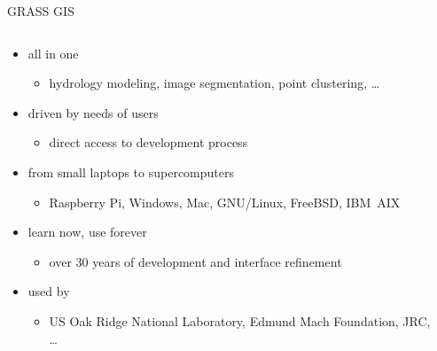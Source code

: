 \documentclass[xcolor={dvipsnames,usenames},beamer,aspectratio=169]{beamer}
\begin{document}
\begin{frame}{GRASS GIS}

\begin{columns}
\begin{column}{0.6\textwidth}

\begin{itemize}
  \item all in one
  \begin{itemize}
   \item hydrology modeling, image segmentation, point clustering, \ldots
  \end{itemize}
  \item driven by needs of users
  \begin{itemize}
   \item direct access to development process
  \end{itemize}
  \item from small laptops to supercomputers
  \begin{itemize}
   \item Raspberry Pi, Windows, Mac, GNU/Linux, FreeBSD, IBM~AIX
  \end{itemize}
  \item learn now, use forever
  \begin{itemize}
    \item over 30 years of development and interface refinement
  \end{itemize}
  \item used by
  \begin{itemize}
    \item US Oak Ridge National Laboratory, Edmund Mach Foundation, JRC, \ldots
  \end{itemize}
\end{itemize}

\end{column}
\begin{column}{0.3\textwidth}


\end{column}
\end{columns}
\end{frame}
\end{document}
